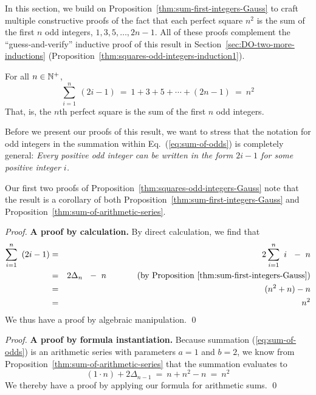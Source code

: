 In this section, we build on Proposition~\ref{thm:sum-first-integers-Gauss} to craft multiple constructive proofs of the fact that each perfect square $n^2$ is the sum of the first $n$ odd integers, $1, 3, 5, \ldots, 2n-1$.  All of these proofs complement the ``guess-and-verify'' inductive
proof of this result in Section~\ref{sec:DO-two-more-inductions}
(Proposition~\ref{thm:squares-odd-integers-induction1}).

\begin{prop}
\label{thm:squares-odd-integers-Gauss}
For all $n \in \mathbb{N}^+$,
\begin{equation}
\label{eq:sum-of-odds}
\sum_{i=1}^n \ (2i-1)
 \ = \ 1 + 3 + 5 + \cdots + (2n-1) \ = \ n^2
\end{equation}
That, is, the $n$th perfect square is the sum of the first $n$ odd integers.
\end{prop}

Before we present our proofs of this result, we want to stress that the notation for odd integers in the summation within Eq.~(\ref{eq:sum-of-odds}) is completely general: {\em Every positive odd integer can be written in the form $2i-1$ for some positive integer $i$.}

\bigskip

Our first two proofs of Proposition~\ref{thm:squares-odd-integers-Gauss} note that the result is a corollary of both Proposition~\ref{thm:sum-first-integers-Gauss} and Proposition~\ref{thm:sum-of-arithmetic-series}.

\medskip

\begin{proof}
{\bf A proof by calculation.}
By direct calculation, we find that
\begin{eqnarray*}
\sum_{i=1}^n \ \left( 2i-1 \right)
   & = & 2 \sum_{i=1}^n \ i \ \ - \ n \\
   & = & 2 \Delta_n \ \ - \ n \ \ \ \ \ \ \ \ \ \ \mbox{ (by
  Proposition~\ref{thm:sum-first-integers-Gauss})} \\
   & = & (n^2 + n) - n \\
   & = & n^2
\end{eqnarray*}
We thus have a proof by algebraic manipulation. \qed
\end{proof}

\medskip

\begin{proof}
{\bf A proof by formula instantiation.}
%
Because summation (\ref{eq:sum-of-odds}) is an arithmetic series with parameters $a=1$ and $b=2$, we know from Proposition~\ref{thm:sum-of-arithmetic-series} that the summation evaluates to
\[ (1 \cdot n) + 2 \Delta_{n-1} \ = \ n + n^2 -n \ = \ n^2 \]
We thereby have a proof by applying our formula for arithmetic sums.  \qed
\end{proof}

